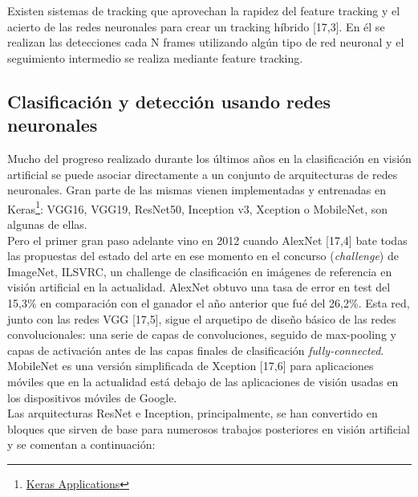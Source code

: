 \documentclass{bmvc2k}
\begin{document}
Existen sistemas de tracking que aprovechan la rapidez del feature tracking y el acierto de las redes neuronales para crear un tracking híbrido [17,3]. En él se realizan las detecciones cada N frames utilizando algún tipo de red neuronal y el seguimiento intermedio se realiza mediante feature tracking. 

\subsection{Clasificación y detección usando redes neuronales}
Mucho del progreso realizado durante los últimos años en la clasificación en visión artificial se puede asociar directamente a un conjunto de arquitecturas de redes neuronales. Gran parte de las mismas vienen implementadas y entrenadas en Keras\footnote {\href{https://keras.io/applications/}{Keras Applications}}: VGG16, VGG19, ResNet50, Inception v3, Xception o MobileNet, son algunas de ellas.\\ Pero el primer gran paso adelante vino en 2012 cuando AlexNet [17,4] bate todas las propuestas del estado del arte en ese momento en el concurso (\textit{challenge}) de ImageNet, ILSVRC, un challenge de clasificación en imágenes de referencia en visión artificial en la actualidad. AlexNet obtuvo una tasa de error en test del 15,3\% en comparación con el ganador el año anterior que fué del 26,2\%. Esta red, junto con las redes VGG [17,5], sigue el arquetipo de diseño básico de las redes convolucionales: una serie de capas de convoluciones, seguido de max-pooling y capas de activación antes de las capas finales de clasificación \textit{fully-connected}. MobileNet es una versión simplificada de Xception [17,6] para aplicaciones móviles que en la actualidad está debajo de las aplicaciones de visión usadas en los dispositivos móviles de Google.\\
Las arquitecturas ResNet e Inception, principalmente, se han convertido en bloques que sirven de base para numerosos trabajos posteriores en visión artificial y se comentan a continuación:
\end{document}
